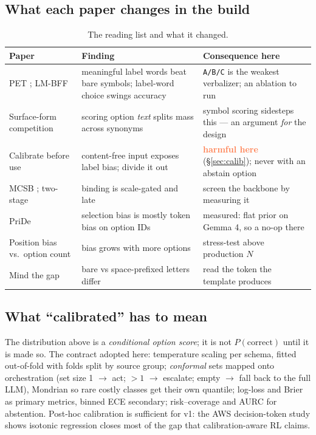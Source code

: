 \documentclass[11pt,a4paper]{article}
\newcommand{\code}[1]{\texttt{#1}}
\newcommand{\hl}[1]{\textcolor{coral}{\textbf{#1}}}
\begin{document}
\subsection{What each paper changes in the build}
\begin{table}[H]
\centering\small
\begin{tabularx}{\textwidth}{L{38mm} X L{48mm}}
\toprule
Paper & Finding & Consequence here \\
\midrule
PET \cite{pet}; LM-BFF \cite{lmbff} & meaningful label words beat bare symbols; label-word choice swings accuracy & \code{A/B/C} is the weakest verbalizer; an ablation to run \\
Surface-form competition \cite{sfc} & scoring option \emph{text} splits mass across synonyms & symbol scoring sidesteps this --- an argument \emph{for} the design \\
Calibrate before use \cite{zhao} & content-free input exposes label bias; divide it out & \hl{harmful here} (\S\ref{sec:calib}); never with an abstain option \\
MCSB \cite{mcsb}; two-stage \cite{twostage} & binding is scale-gated and late & screen the backbone by measuring it \\
PriDe \cite{pride} & selection bias is mostly token bias on option IDs & measured: flat prior on Gemma 4, so a no-op there \\
Position bias vs.\ option count \cite{leeson} & bias grows with more options & stress-test above production $N$ \\
Mind the gap \cite{gap} & bare vs space-prefixed letters differ & read the token the template produces \\
\bottomrule
\end{tabularx}
\caption{The reading list and what it changed.}
\end{table}

\subsection{What ``calibrated'' has to mean}
The distribution above is a \emph{conditional option score}; it is not $P(\text{correct})$ until it is made so. The contract adopted here: temperature scaling per schema, fitted out-of-fold with folds split by source group; \emph{conformal} sets mapped onto orchestration (set size 1 $\to$ act; $>1$ $\to$ escalate; empty $\to$ fall back to the full LLM), Mondrian so rare costly classes get their own quantile; log-loss and Brier as primary metrics, binned ECE secondary; risk--coverage and AURC for abstention. Post-hoc calibration is sufficient for v1: the AWS decision-token study \cite{awsdt} shows isotonic regression closes most of the gap that calibration-aware RL claims.
\end{document}
